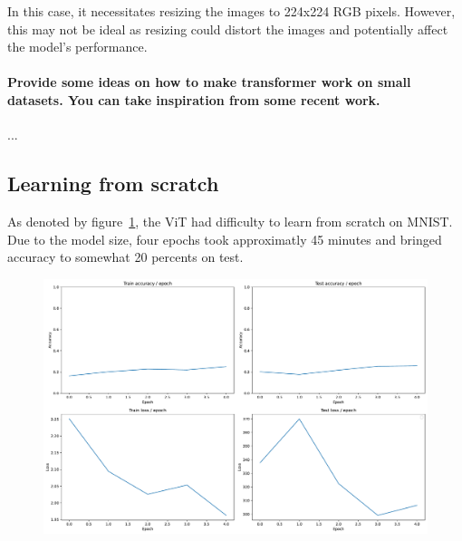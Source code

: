 In this case, it necessitates resizing the images to 224x224 RGB pixels. However, this may not be ideal as resizing could distort the images and potentially affect the model's performance.

\paragraph{Provide some ideas on how to make transformer work on small datasets. You can take inspiration from some recent work.}
...

\subsection{Learning from scratch}
As denoted by figure~\ref{fig:stats_vit}, the ViT had difficulty to learn from scratch on MNIST. Due to the model size, four epochs took approximatly 45 minutes and bringed accuracy to somewhat 20 percents on test. 

\begin{figure}[H]
    \centering
    \includegraphics*[width=\textwidth]{figs/Transformers/stats_vit.pdf}
    \caption{}
    \label{fig:stats_vit}
\end{figure}


